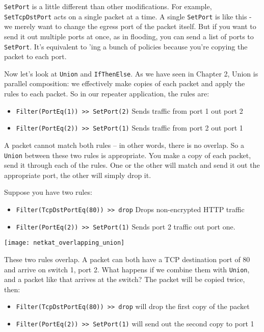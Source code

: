 \texttt{SetPort} is a little different than other modifications.  
For example, \texttt{SetTcpDstPort} acts on a single packet at a time.
A single \texttt{SetPort} is like this - we merely want to change the egress port of the packet itself.  But if 
you want to send it out multiple ports at once, as in flooding, you can send a list of ports to \texttt{SetPort}.
It's equivalent to 'ing a bunch of  policies because you're copying the packet
to each port.  

Now let's look at \texttt{Union} and \texttt{IfThenElse}.  
As we have seen in Chapter 2, Union is parallel composition:
we effectively make copies of each packet and apply the rules to each packet.  So in our 
repeater application, the rules are:

\begin{itemize}
  \item \texttt{Filter(PortEq(1)) >> SetPort(2)} Sends traffic from port 1 out port 2 
  \item \texttt{Filter(PortEq(2)) >> SetPort(1)} Sends traffic from port 2 out port 1 
\end{itemize}

A packet cannot match both rules -- in other words, there is no overlap.  So a \texttt{Union} between
these two rules is appropriate.  You make a copy of each packet, send it through each of the rules.  
One or the other will match and send it out the appropriate port, the other will simply drop it.  

Suppose you have two rules:

\begin{itemize}
  \item \texttt{Filter(TcpDstPortEq(80)) >> drop} Drops non-encrypted HTTP traffic 
  \item \texttt{Filter(PortEq(2)) >> SetPort(1)} Sends port 2 traffic out port one.
\end{itemize}

\texttt{[image: netkat\_overlapping\_union]}

These two rules overlap.  A packet can both have a TCP destination port of 80 and
arrive on switch 1, port 2.  What happens if we combine them with \texttt{Union}, and a packet
like that arrives at the switch?  The packet will be copied twice, then:

\begin{itemize}
  \item \texttt{Filter(TcpDstPortEq(80)) >> drop} will drop the first copy of the packet 
  \item \texttt{Filter(PortEq(2)) >> SetPort(1)} will send out the second copy to port 1
\end{itemize}

